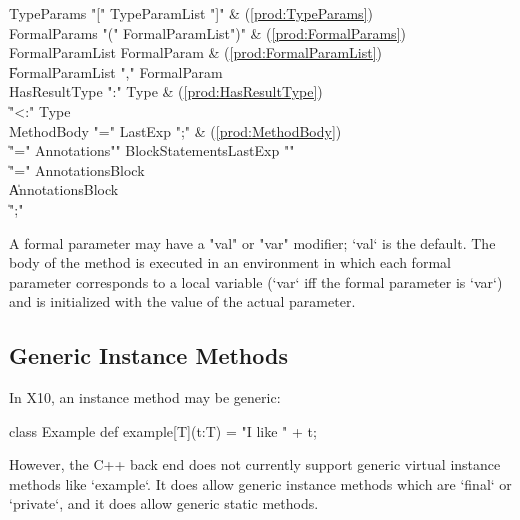 \begin{bbgrammar}
          TypeParams \: \xcd"[" TypeParamList \xcd"]" & (\ref{prod:TypeParams}) \\
        FormalParams \: \xcd"(" FormalParamList\opt \xcd")" & (\ref{prod:FormalParams}) \\
     FormalParamList \: FormalParam & (\ref{prod:FormalParamList}) \\
                    \| FormalParamList \xcd"," FormalParam \\
       HasResultType \: \xcd":" Type & (\ref{prod:HasResultType}) \\
                    \| \xcd"<:" Type \\
          MethodBody \: \xcd"=" LastExp \xcd";" & (\ref{prod:MethodBody}) \\
                    \| \xcd"=" Annotations\opt \xcd"{" BlockStatements\opt LastExp \xcd"}" \\
                    \| \xcd"=" Annotations\opt Block \\
                    \| Annotations\opt Block \\
                    \| \xcd";" \\
\end{bbgrammar}


A formal parameter may have a \xcd"val" or \xcd"var"
modifier; \xcd`val` is the default.
The body of the method is executed in an environment in which 
each formal parameter corresponds to a local variable (\xcd`var` iff the
formal parameter is \xcd`var`)
and is initialized with the value of the actual parameter.

\subsection{Generic Instance Methods}

\limitationx{}
In X10, an instance method may be generic: 
\begin{xten}
class Example {
  def example[T](t:T) = "I like " + t;
}
\end{xten}
%

However, the C++ back end does not currently support generic virtual instance
methods like \xcd`example`.  It does allow generic instance methods which are
\xcd`final` or \xcd`private`, and it does allow generic static methods.  


